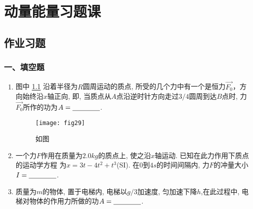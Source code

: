 \chapter{动量能量习题课}
\section{作业习题}
\subsection*{一、填空题}

\begin{enumerate}
    \item 图中 \ref{fig:29} 沿着半径为$R$圆周运动的质点, 所受的几个力中有一个是恒力$\vec{F_0}$，方向始终沿$x$轴正向, 
    即, 当质点从$A$点沿逆时针方向走过$3/4$圆周到达$B$点时, 力$\vec{F_0}$所作的功为$A=\nl$.
    \begin{figure}[H]
        \centering
        \texttt{[image: fig29]}
            \caption{如图}\label{fig:29}
    \end{figure}
    \item 一个力$F$作用在质量为$2.0 kg$的质点上, 使之沿$x$轴运动. 已知在此力作用下质点的运动学方程
    为$x=3t-4t^2+t^3$(SI). 在0到$4s$的时间间隔内, 力$F$的冲量大小$I=\nl$.
    \item  质量为$m$的物体, 置于电梯内, 电梯以$g/3$加速度, 匀加速下降$h$,在此过程中, 
    电梯对物体的作用力所做的功$A=\nl$.
\end{enumerate}
